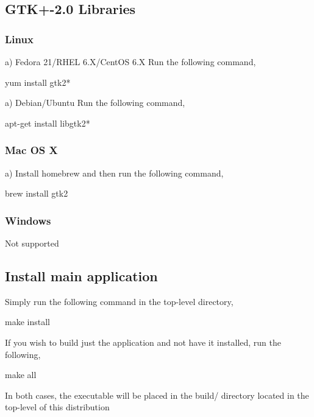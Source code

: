 \subsection*{G\+T\+K+-\/2.0 Libraries}

\subsubsection*{Linux}

a) Fedora 21/\+R\+H\+E\+L 6.\+X/\+Cent\+O\+S 6.\+X Run the following command, \begin{DoxyVerb}    yum install gtk2*
\end{DoxyVerb}


a) Debian/\+Ubuntu Run the following command, \begin{DoxyVerb}    apt-get install libgtk2*
\end{DoxyVerb}


\subsubsection*{Mac O\+S X}

a) Install homebrew and then run the following command, \begin{DoxyVerb}    brew install gtk2
\end{DoxyVerb}


\subsubsection*{Windows}

Not supported 



\subsection*{Install main application}

Simply run the following command in the top-\/level directory, \begin{DoxyVerb}    make install 
\end{DoxyVerb}


If you wish to build just the application and not have it installed, run the following, \begin{DoxyVerb}    make all 
\end{DoxyVerb}


In both cases, the executable will be placed in the {\ttfamily build/} directory located in the top-\/level of this distribution 



